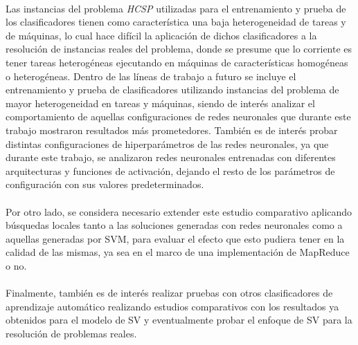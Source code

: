 \paragraph{}Las instancias del problema \textit{HCSP} utilizadas para el entrenamiento y prueba de los clasificadores tienen como característica una baja heterogeneidad de tareas y de máquinas, lo cual hace difícil la aplicación de dichos clasificadores a la resolución de instancias reales del problema, donde se presume que lo corriente es tener tareas heterogéneas ejecutando en máquinas de características homogéneas o heterogéneas.
Dentro de las líneas de trabajo a futuro se incluye el entrenamiento y prueba de clasificadores utilizando instancias del problema de mayor heterogeneidad en tareas y máquinas, siendo de interés analizar el comportamiento de aquellas configuraciones de redes neuronales que durante este trabajo mostraron resultados más prometedores.
También es de interés probar distintas configuraciones de hiperparámetros de las redes neuronales, ya que durante este trabajo, se analizaron redes neuronales entrenadas con diferentes arquitecturas y funciones de activación, dejando el resto de los parámetros de configuración con sus valores predeterminados. 

\paragraph{}Por otro lado, se considera necesario extender este estudio comparativo aplicando búsquedas locales tanto a las soluciones generadas con redes neuronales como a aquellas generadas por SVM, para evaluar el efecto que esto pudiera tener en la calidad de las mismas, ya sea en el marco de una implementación de MapReduce o no.

\paragraph{}Finalmente, también es de interés realizar pruebas con otros clasificadores de aprendizaje automático realizando estudios comparativos con los resultados ya obtenidos para el modelo de SV y eventualmente probar el enfoque de SV para la resolución de problemas reales.
